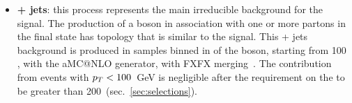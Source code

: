 
\begin{itemize}
  \item {\bf \Z + jets}: this process represents the main irreducible background for the signal. The production of a \Z boson in association with one or more partons in the final state has topology that is similar to the signal. This \Z + jets background is produced in samples binned in \pt of the \Z boson, starting from 100 \GeV, with the {\sc aMC@NLO} generator, with FXFX merging~\cite{bib:FXFX}. The contribution from events with $p_T<100$~GeV is negligible after the requirement on the \met to be greater than 200~\GeV (sec.~\ref{sec:selections}).


\end{itemize}
